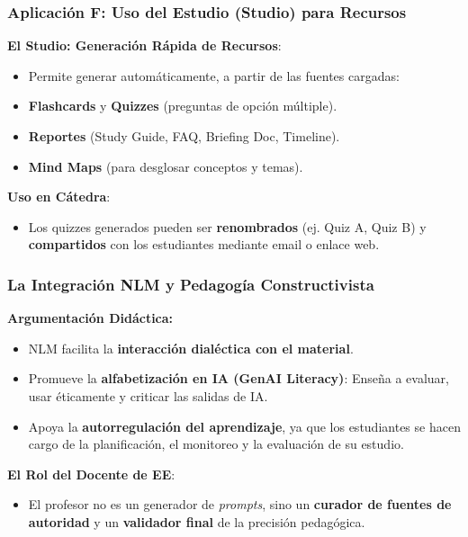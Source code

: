\documentclass[aspectratio=43]{beamer}
\begin{document}
\begin{frame}
\frametitle{ Aplicación F: Uso del Estudio (Studio) para Recursos}

\textbf{El Studio: Generación Rápida de Recursos}:
\begin{itemize}
    \item Permite generar automáticamente, a partir de las fuentes cargadas:
    \item \textbf{Flashcards} y \textbf{Quizzes} (preguntas de opción múltiple).
    \item \textbf{Reportes} (Study Guide, FAQ, Briefing Doc, Timeline).
    \item \textbf{Mind Maps} (para desglosar conceptos y temas).
\end{itemize}

\vfill
\textbf{Uso en Cátedra}:
\begin{itemize}
    \item Los quizzes generados pueden ser \textbf{renombrados} (ej. Quiz A, Quiz B) y \textbf{compartidos} con los estudiantes mediante email o enlace web.
\end{itemize}
\end{frame}


\begin{frame}
\frametitle{ La Integración NLM y Pedagogía Constructivista}

\textbf{Argumentación Didáctica:}
\begin{itemize}
    \item NLM facilita la \textbf{interacción dialéctica con el material}.
    \item Promueve la \textbf{alfabetización en IA (GenAI Literacy)}: Enseña a evaluar, usar éticamente y criticar las salidas de IA.
    \item Apoya la \textbf{autorregulación del aprendizaje}, ya que los estudiantes se hacen cargo de la planificación, el monitoreo y la evaluación de su estudio.
\end{itemize}
\vfill
\textbf{El Rol del Docente de EE}:
\begin{itemize}
    \item El profesor no es un generador de \textit{prompts}, sino un \textbf{curador de fuentes de autoridad} y un \textbf{validador final} de la precisión pedagógica.
\end{itemize}
\end{frame}

\end{document}
